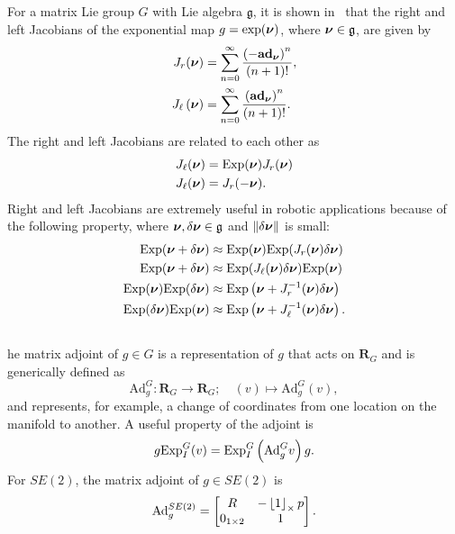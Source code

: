 For a matrix Lie group $G$ with Lie algebra $\mathfrak{g}$, it is shown in~\cite{Barfoot2019} that the right and left Jacobians of the exponential map $g=\exp(\nubf)$, where $\nubf \in \mathfrak{g}$, are given by 
\begin{align} 
J_{r}(\nubf) & =\sum_{n=0}^{\infty}\frac{\left(-\mathbf{ad}_{\nubf}\right)^{n}}{\left(n+1\right)!}, 
\label{eq:exponential_right_jacobians}
\\
J_{\ell}\left(\nubf\right) & =\sum_{n=0}^{\infty}\frac{\left(\mathbf{ad}_{\nubf}\right)^{n}}{\left(n+1\right)!}.
\label{eq:exponential_left_jacobians}
\end{align}
The right and left Jacobians are related to each other as
\begin{align*}
J_\ell(\nubf) &= \Exp(\nubf) J_r(\nubf) \\
J_\ell(\nubf) &= J_r(-\nubf).
\end{align*}
Right and left Jacobians are extremely useful in robotic applications because of the following property, where $\nubf, \delta\nubf\in\mathfrak{g}$ and $\norm{\delta\nubf}$ is small:
\begin{subequations}\label{eq:Jacobian_property}
\begin{align}
\Exp(\nubf + \delta\nubf) &\approx \Exp(\nubf)\Exp(J_r(\nubf)\delta\nubf) \\
\Exp(\nubf + \delta\nubf) &\approx \Exp(J_\ell(\nubf)\delta\nubf)\Exp(\nubf) \\
\Exp(\nubf)\Exp(\delta\nubf) & \approx\Exp\left(\nubf+J_{r}^{-1}(\nubf)\delta\nubf\right) \\
\Exp(\delta\nubf)\Exp(\nubf) & \approx\Exp\left(\nubf+J_{\ell}^{-1}(\nubf)\delta\nubf\right).
\end{align}
\end{subequations}



\subsection{}
he matrix adjoint of $g\in G$ is a representation of $g$ that acts on $\mathbf{R}_G$ and is generically defined as 
\[
\text{Ad}^G_{g}:\mathbf{R}_G\to\mathbf{R}_G;\quad\left(v\right)\mapsto \text{Ad}^{G}_{g}(v),
\]
and represents, for example, a change of coordinates from one location on the manifold to another.
A useful property of the adjoint is 
\begin{equation}\label{eq:lie_groups_review_adjoint_relation}
g\Exp_I^{G}(v)=\Exp_I^{G}\left(\text{Ad}^G_g v\right)g.    
\end{equation}
%
For $SE(2)$, the matrix adjoint of $g \in SE(2)$ is
%
\begin{equation}
    \text{Ad}^{SE(2)}_g = \begin{bmatrix}
    R & -\ss{1} p\\
    0_{1\times 2} &1
    \end{bmatrix}.
\end{equation}

